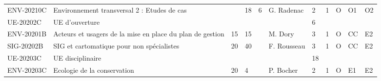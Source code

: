 \documentclass[a4paper,11pt]{article}
\begin{document}
{{\begin{tabular}{lllllllllll}
ENV-20210C                     & Environnement transversal 2 : Etudes de cas                                               &                           & 18                        & 6                         & G. Radenac                         & 2                           & 1                           & O                                  & O1                               & O2                               \\
\rowcolor[HTML]{C0C0C0} 
UE-20202C                      & UE d'ouverture                                                                            &                           &                           &                           &                                    & 6                           &                             &                                    &                                  &                                  \\
ENV-20201B                     & Acteurs et usagers de la mise en place du plan de gestion                                 & 15                        & 15                        &                           & M. Dory                            & 3                           & 1                           & O                                  & CC                               & E2                               \\
SIG-20202B                     & SIG et cartomatique pour non spécialistes                                                 & 20                        & 40                        &                           & F. Rousseau                        & 3                           & 1                           & O                                  & CC                               & E2                               \\
\rowcolor[HTML]{C0C0C0} 
UE-20203C                      & UE disciplinaire                                                                          &                           &                           &                           &                                    & 18                          &                             &                                    &                                  &                                  \\
ENV-20203C                     & Ecologie de la conservation                                                               & 20                        & 4                         &                           & P. Bocher                          & 2                           & 1                           & O                                  & E1                               & E2                               \\

\end{tabular}}}
\end{document}

